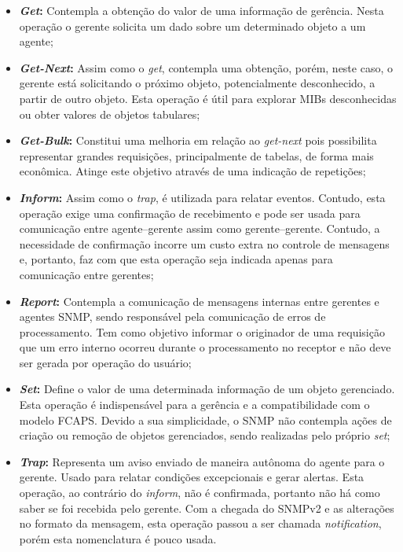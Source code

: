 \documentclass[twoside,english,brazilian]{UNISINOSmonografia}
\begin{document}
\begin{itemize}

\item \textbf{\textit{Get}:}
Contempla a obtenção do valor de uma informação de gerência. Nesta operação o 
gerente solicita um dado sobre um determinado objeto a um agente;

\item \textbf{\textit{Get-Next}:}
Assim como o \textit{get}, contempla uma obtenção, porém, neste caso, o 
gerente está solicitando o próximo objeto, potencialmente desconhecido, a 
partir de outro objeto. 
Esta operação é útil para explorar MIBs desconhecidas ou obter valores 
de objetos tabulares;

\item \textbf{\textit{Get-Bulk}:}
Constitui uma melhoria em relação ao \textit{get-next} pois possibilita 
representar grandes requisições, principalmente de tabelas, de forma mais 
econômica.
Atinge este objetivo através de uma indicação de repetições;

\item \textbf{\textit{Inform}:}
Assim como o \textit{trap}, é utilizada para relatar eventos.
Contudo, esta operação exige uma confirmação de recebimento e pode ser usada 
para comunicação entre agente--gerente assim como gerente--gerente.
Contudo, a necessidade de confirmação incorre um custo extra no controle de 
mensagens e, portanto, faz com que esta operação seja indicada apenas para 
comunicação entre gerentes;

\item \textbf{\textit{Report}:}
Contempla a comunicação de mensagens internas entre gerentes e agentes SNMP, 
sendo responsável pela comunicação de erros de processamento.
Tem como objetivo informar o originador de uma requisição que um erro interno 
ocorreu durante o processamento no receptor e não deve ser gerada por operação 
do usuário;

\item \textbf{\textit{Set}:}
Define o valor de uma determinada informação de um objeto gerenciado. 
Esta operação é indispensável para a gerência e a compatibilidade com o 
modelo FCAPS. 
Devido a sua simplicidade, o SNMP não contempla ações de criação ou remoção de 
objetos gerenciados, sendo realizadas pelo próprio \textit{set};

\item \textbf{\textit{Trap}:}
Representa um aviso enviado de maneira autônoma do agente para o gerente. 
Usado para relatar condições excepcionais e gerar alertas.
Esta operação, ao contrário do \textit{inform}, não é confirmada, portanto
não há como saber se foi recebida pelo gerente.
Com a chegada do SNMPv2 e as alterações no formato da mensagem, 
esta operação passou a ser chamada \textit{notification}, 
porém esta nomenclatura é pouco usada.

\end{itemize}
\end{document}
